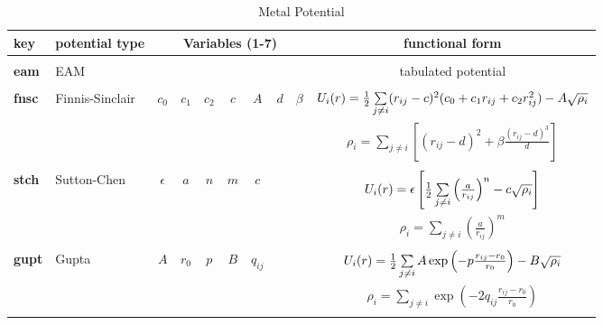 \begin{table}[htbp]
\begin{centering}
\caption{\label{mettable} Metal Potential}
\vskip 5pt
\begin{tabular}{|l|l|c|c|c|c|c|c|c|c|}
\hline
key & potential type & \multicolumn{7}{c|}{Variables (1-7)}& functional form \\
\hline
           &                 &         &         &         &     &          &     &         & \\
{\bf eam}  & EAM             &         &         &         &     &          &     &         &
tabulated potential \\
           &                 &         &         &         &     &          &     &         & \\
{\bf fnsc} & Finnis-Sinclair & $c_{0}$ & $c_{1}$ & $c_{2}$ & $c$ & $A$      & $d$ & $\beta$ &
$U_{i}(r) = {1 \over 2} \sum\limits_{j \ne i} (r_{ij}-c)^{2} (c_{0}+c_{1}r_{ij}+c_{2}r_{ij}^{2}) - A \sqrt{\rho_{i}}$ \\
           &                 &         &         &         &     &          &     &         &
$\rho_{i} = \sum\limits_{j\ne i} \left[(r_{ij}-d)^{2} + \beta \frac{(r_{ij}-d)^{3}}{d}\right]$ \\
           &                 &         &         &         &     &          &     &         & \\
{\bf stch} & Sutton-Chen     & $\epsilon$ & $a$  & $n$     & $m$ & $c$      &     &         &
$U_{i}(r) = \epsilon \left[ {1 \over 2} \sum\limits_{j \ne i} \left(
\frac{a}{r_{ij}} \right)^{n} - c \sqrt{\rho_{i}} \right]$ \\
           &                 &         &         &         &     &          &     &         &
$\rho_{i} = \sum\limits_{j\ne i} \left(\frac{a}{r_{ij}}\right )^{m}$ \\
           &                 &         &         &         &     &          &     &         & \\
{\bf gupt} & Gupta           & $A$     & $r_{0}$ & $p$     & $B$ & $q_{ij}$ &     &         &
$U_{i}(r) = {1 \over 2} \sum\limits_{j \ne i} A \exp \left(-p \frac{r_{ij}-r_{0}}{r_{0}}\right) - B \sqrt{\rho_{i}}$ \\
           &                 &         &         &         &     &          &     &         &
$\rho_{i} = \sum\limits_{j\ne i} \exp \left(-2 q_{ij} \frac{r_{ij}-r_{0}}{r_{0}}\right)$ \\
           &                 &         &         &         &     &          &     &         & \\
\hline
\end{tabular}
\end{centering}
\vskip 5mm
\end{table}

